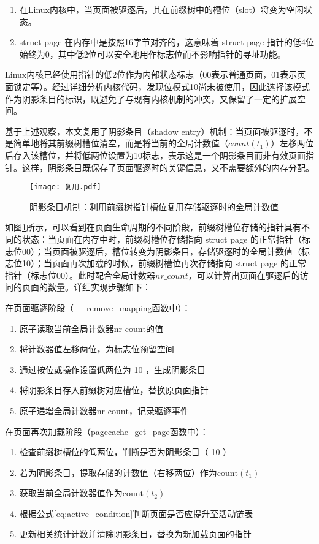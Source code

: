 \begin{enumerate}
  \item 在Linux内核中，当页面被驱逐后，其在前缀树中的槽位（slot）将变为空闲状态。
  \item  struct page 在内存中是按照16字节对齐的，这意味着 struct page 指针的低4位始终为0，其中低2位可以安全地用作标志位而不影响指针的寻址功能。
\end{enumerate}

Linux内核已经使用指针的低2位作为内部状态标志（00表示普通页面，01表示页面锁定等）。经过详细分析内核代码，发现位模式10尚未被使用，因此选择该模式作为阴影条目的标识，既避免了与现有内核机制的冲突，又保留了一定的扩展空间。

基于上述观察，本文复用了阴影条目（shadow entry）机制：当页面被驱逐时，不是简单地将其前缀树槽位清空，而是将当前的全局计数值（\(count(t_1)\)）左移两位后存入该槽位，并将低两位设置为10标志，表示这是一个阴影条目而非有效页面指针。这样，阴影条目既保存了页面驱逐时的关键信息，又不需要额外的内存分配。

\begin{figure}[htbp]
  \centering
  \texttt{[image: 复用.pdf]}
  \caption{阴影条目机制：利用前缀树指针槽位复用存储驱逐时的全局计数值}
  \label{fig:复用}
\end{figure}

如图\ref{fig:复用}所示，可以看到在页面生命周期的不同阶段，前缀树槽位存储的指针具有不同的状态：当页面在内存中时，前缀树槽位存储指向 struct page 的正常指针（标志位00）；当页面被驱逐后，槽位转变为阴影条目，存储驱逐时的全局计数值（标志位10）；当页面再次加载的时候，前缀树槽位再次存储指向 struct page 的正常指针（标志位00）。此时配合全局计数器\(nr\_count\)，可以计算出页面在驱逐后的访问的页面的数量。详细实现步骤如下：

在页面驱逐阶段（\_\_remove\_mapping函数中）：
\begin{enumerate}
  \item 原子读取当前全局计数器\(\mathrm{nr\_count}\)的值
  \item 将计数器值左移两位，为标志位预留空间
  \item 通过按位或操作设置低两位为 10 ，生成阴影条目
  \item 将阴影条目存入前缀树对应槽位，替换原页面指针
  \item 原子递增全局计数器\(\mathrm{nr\_count}\)，记录驱逐事件
\end{enumerate}

在页面再次加载阶段（pagecache\_get\_page函数中）：
\begin{enumerate}
  \item 检查前缀树槽位的低两位，判断是否为阴影条目（ 10 ）
  \item 若为阴影条目，提取存储的计数值（右移两位）作为\(\mathrm{count}(t_1)\)
  \item 获取当前全局计数器值作为\(\mathrm{count}(t_2)\)
  \item 根据公式\ref{eq:active_condition}判断页面是否应提升至活动链表
  \item 更新相关统计计数并清除阴影条目，替换为新加载页面的指针
\end{enumerate}

